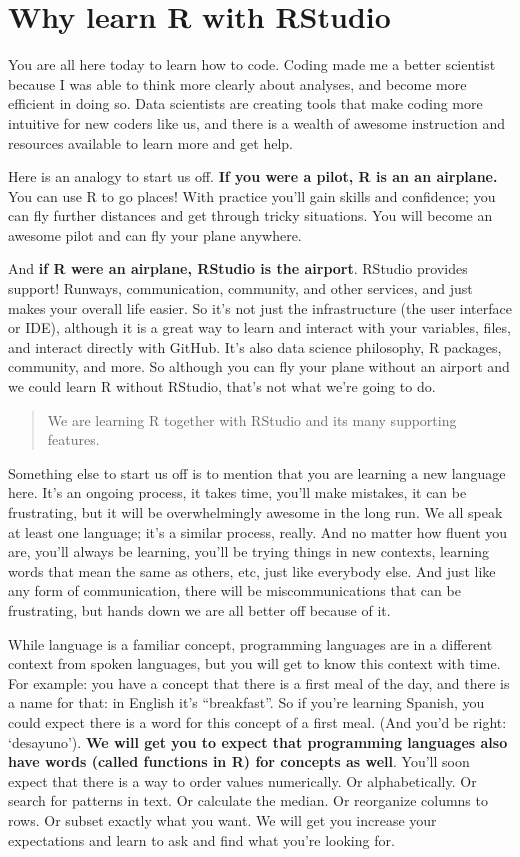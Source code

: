\documentclass[]{book}
\theoremstyle{definition}
\theoremstyle{definition}
\theoremstyle{definition}
\theoremstyle{remark}
\begin{document}
\section{Why learn R with RStudio}\label{why-learn-r-with-rstudio}

You are all here today to learn how to code. Coding made me a better
scientist because I was able to think more clearly about analyses, and
become more efficient in doing so. Data scientists are creating tools
that make coding more intuitive for new coders like us, and there is a
wealth of awesome instruction and resources available to learn more and
get help.

Here is an analogy to start us off. \textbf{If you were a pilot, R is an
an airplane.} You can use R to go places! With practice you'll gain
skills and confidence; you can fly further distances and get through
tricky situations. You will become an awesome pilot and can fly your
plane anywhere.

And \textbf{if R were an airplane, RStudio is the airport}. RStudio
provides support! Runways, communication, community, and other services,
and just makes your overall life easier. So it's not just the
infrastructure (the user interface or IDE), although it is a great way
to learn and interact with your variables, files, and interact directly
with GitHub. It's also data science philosophy, R packages, community,
and more. So although you can fly your plane without an airport and we
could learn R without RStudio, that's not what we're going to do.

\begin{quote}
We are learning R together with RStudio and its many supporting
features.
\end{quote}

Something else to start us off is to mention that you are learning a new
language here. It's an ongoing process, it takes time, you'll make
mistakes, it can be frustrating, but it will be overwhelmingly awesome
in the long run. We all speak at least one language; it's a similar
process, really. And no matter how fluent you are, you'll always be
learning, you'll be trying things in new contexts, learning words that
mean the same as others, etc, just like everybody else. And just like
any form of communication, there will be miscommunications that can be
frustrating, but hands down we are all better off because of it.

While language is a familiar concept, programming languages are in a
different context from spoken languages, but you will get to know this
context with time. For example: you have a concept that there is a first
meal of the day, and there is a name for that: in English it's
``breakfast''. So if you're learning Spanish, you could expect there is
a word for this concept of a first meal. (And you'd be right:
`desayuno'). \textbf{We will get you to expect that programming
languages also have words (called functions in R) for concepts as well}.
You'll soon expect that there is a way to order values numerically. Or
alphabetically. Or search for patterns in text. Or calculate the median.
Or reorganize columns to rows. Or subset exactly what you want. We will
get you increase your expectations and learn to ask and find what you're
looking for.
\end{document}
